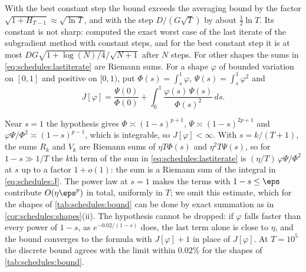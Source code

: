 \begin{refsection}
With the best constant step the bound exceeds the averaging bound by the factor $\sqrt{1+H_{T-1}}\approx\sqrt{\ln T}$, and with the step $D/(G\sqrt T)$ by about $\frac12\ln T$. Its constant is not sharp: \textcite{ZamaniGlineur2025} computed the exact worst case of the last iterate of the subgradient method with constant steps, and for the best constant step it is at most $DG\sqrt{1+\log(N)/4}/\sqrt{N+1}$ after $N$ steps. For other shapes the sums in \eqref{eq:schedules:lastiterate} are Riemann sums. For a shape $\varphi$ of bounded variation on $[0,1]$ and positive on $[0,1)$, put $\Phi(s)=\int_s^1\varphi$, $\Psi(s)=\int_s^1\varphi^2$ and
\begin{equation}\label{eq:schedules:J}
  J[\varphi]=\frac{\Psi(0)}{\Phi(0)}+\int_0^1\frac{\varphi(s)\,\Psi(s)}{\Phi(s)^2}\,ds .
\end{equation}


\begin{proofsketch}
Near $s=1$ the hypothesis gives $\Phi\asymp(1-s)^{p+1}$, $\Psi\asymp(1-s)^{2p+1}$ and $\varphi\Psi/\Phi^2\asymp(1-s)^{p-1}$, which is integrable, so $J[\varphi]<\infty$. With $s=k/(T+1)$, the sums $R_k$ and $V_k$ are Riemann sums of $\eta T\Phi(s)$ and $\eta^2T\Psi(s)$, so for $1-s\gg1/T$ the $k$th term of the sum in \eqref{eq:schedules:lastiterate} is $(\eta/T)\,\varphi\Psi/\Phi^2$ at $s$ up to a factor $1+o(1)$: the sum is a Riemann sum of the integral in \eqref{eq:schedules:J}. The power law at $s=1$ makes the terms with $1-s\le\eps$ contribute $O(\eta\eps^p)$ in total, uniformly in $T$; we omit this estimate, which for the shapes of \cref{tab:schedules:bound} can be done by exact summation as in \cref{cor:schedules:shapes}(ii). The hypothesis cannot be dropped: if $\varphi$ falls faster than every power of $1-s$, as $e^{-0.02/(1-s)}$ does, the last term alone is close to $\eta$, and the bound converges to the formula with $J[\varphi]+1$ in place of $J[\varphi]$. At $T=10^5$ the discrete bound agrees with the limit within $0.02\%$ for the shapes of \cref{tab:schedules:bound}.
\end{proofsketch}


\end{refsection}
